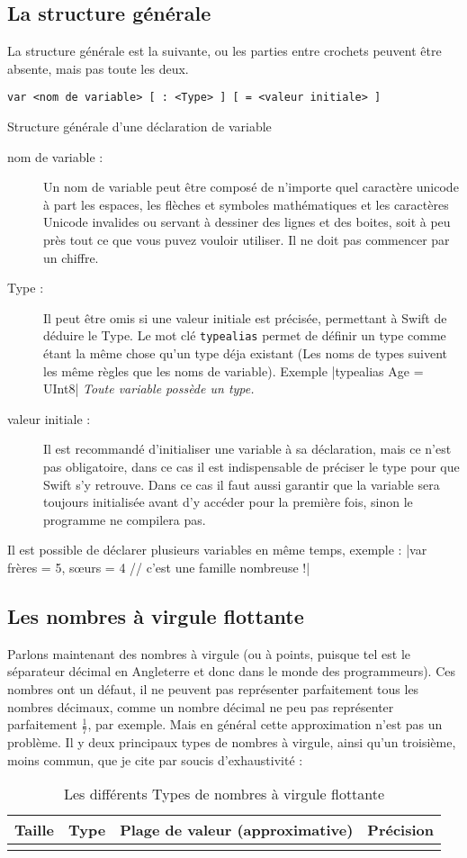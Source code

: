 \subsection{La structure générale}
La structure générale est la suivante, ou les parties entre crochets peuvent être absente, mais pas toute les deux.
\begin{listing}[h]
\begin{verbatim}
var <nom de variable> [ : <Type> ] [ = <valeur initiale> ]
\end{verbatim}
\caption{Structure générale d'une déclaration de variable}
\end{listing}
\begin{description}
\item[nom de variable :] Un nom de variable peut être composé de n'importe quel caractère unicode à part les espaces, les flèches et symboles mathématiques et les caractères Unicode invalides ou servant à dessiner des lignes et des boites, soit à peu près tout ce que vous puvez vouloir utiliser. Il ne doit pas commencer par un chiffre.
\item[Type :] Il peut être omis si une valeur initiale est précisée, permettant à Swift de déduire le Type.
Le mot clé \texttt{typealias} permet de définir un type comme étant la même chose qu'un type déja existant (Les noms de types suivent les même règles que les noms de variable). Exemple |typealias Age = UInt8|
\emph{Toute variable possède un type.}
\item[valeur initiale :] Il est recommandé d'initialiser une variable à sa déclaration, mais ce n'est pas obligatoire, dans ce cas il est indispensable de préciser le type pour que Swift s'y retrouve. Dans ce cas il faut aussi garantir que la variable sera toujours initialisée avant d'y accéder pour la première fois, sinon le programme ne compilera pas.
\end{description}
Il est possible de déclarer plusieurs variables en même temps, exemple :
|var frères = 5, sœurs = 4 // c'est une famille nombreuse !|
\subsection{Les nombres à virgule flottante}
Parlons maintenant des nombres à virgule (ou à points, puisque tel est le séparateur décimal en Angleterre et donc dans le monde des programmeurs).
Ces nombres ont un défaut, il ne peuvent pas représenter parfaitement tous les nombres décimaux, comme un nombre décimal ne peu pas représenter parfaitement \begin{math} \frac{1}{7} \end{math}, par exemple. Mais en général cette approximation n'est pas un problème.
Il y deux principaux types de nombres à virgule, ainsi qu'un troisième, moins commun, que je cite par soucis d'exhaustivité :
\begin{longtabu} to \linewidth {|X[3,l,m]|X[1,l,m]|X[4,r,m]|X[3,r,m]|}
\hline Taille & Type & Plage de valeur (approximative) & Précision \\ \hline
\endhead

\caption{Les différents Types de nombres à virgule flottante}
\end{longtabu}

